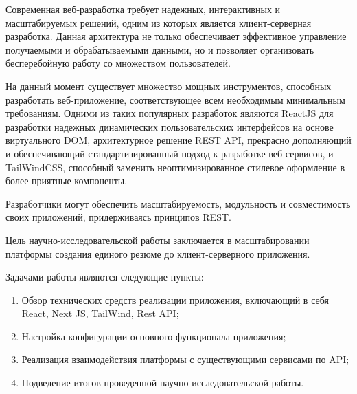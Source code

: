 \documentclass[master, och, pract]{SCWorks}
\begin{document}
\secNumbering

\tableofcontents









\intro
Современная веб-разработка требует надежных, интерактивных и масштабируемых решений, одним из которых является клиент-серверная разработка. Данная архитектура не только обеспечивает эффективное управление получаемыми и обрабатываемыми данными, но и позволяет организовать бесперебойную работу со множеством пользователей.

На данный момент существует множество мощных инструментов, способных разработать веб-приложение, соответствующее всем необходимым минимальным требованиям. Одними из таких популярных разработок являются ReactJS для разработки надежных динамических пользовательских интерфейсов на основе виртуального DOM, архитектурное решение REST API, прекрасно дополняющий и обеспечивающий стандартизированный подход к разработке веб-сервисов, и TailWindCSS, способный заменить неоптимизированное стилевое оформление в более приятные компоненты.

Разработчики могут обеспечить масштабируемость, модульность и совместимость своих приложений, придерживаясь принципов REST. 

Цель научно-исследовательской работы заключается в масштабировании платформы создания единого резюме до клиент-серверного приложения.

Задачами работы являются следующие пункты: 
\begin{enumerate}
    \item Обзор технических средств реализации приложения, включающий в себя React, Next JS, TailWind, Rest API;
    \item Настройка конфигурации основного функционала приложения;
    \item Реализация взаимодействия платформы с существующими сервисами по API;
    \item Подведение итогов проведенной научно-исследовательской работы.
\end{enumerate}
\end{document}
